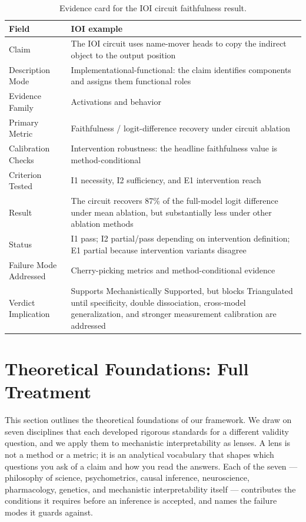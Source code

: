 \documentclass{article}
\begin{document}
\begin{table}[H]
\centering
\small
\caption{Evidence card for the IOI circuit faithfulness result.}
\renewcommand{\arraystretch}{1.2}
\begin{tabular}{@{}lp{10cm}@{}}
\toprule
\textbf{Field} & \textbf{IOI example} \\
\midrule
Claim & The IOI circuit uses name-mover heads to copy the indirect object to the output position \\
\midrule
Description Mode & Implementational-functional: the claim identifies components and assigns them functional roles \\
\midrule
Evidence Family & Activations and behavior \\
\midrule
Primary Metric & Faithfulness / logit-difference recovery under circuit ablation \\
\midrule
Calibration Checks & Intervention robustness: the headline faithfulness value is method-conditional \\
\midrule
Criterion Tested & I1 necessity, I2 sufficiency, and E1 intervention reach \\
\midrule
Result & The circuit recovers 87\% of the full-model logit difference under mean ablation, but substantially less under other ablation methods \\
\midrule
Status & I1 pass; I2 partial/pass depending on intervention definition; E1 partial because intervention variants disagree \\
\midrule
Failure Mode Addressed & Cherry-picking metrics and method-conditional evidence \\
\midrule
Verdict Implication & Supports Mechanistically Supported, but blocks Triangulated until specificity, double dissociation, cross-model generalization, and stronger measurement calibration are addressed \\
\bottomrule
\end{tabular}
\label{tabevidencecardioi}
\end{table}

\section{Theoretical Foundations: Full Treatment}
\label{app:foundations}

This section outlines the theoretical foundations of our framework. We draw on seven disciplines that each developed rigorous standards for a different validity question, and we apply them to mechanistic interpretability as lenses. A lens is not a method or a metric; it is an analytical vocabulary that shapes which questions you ask of a claim and how you read the answers. Each of the seven --- philosophy of science, psychometrics, causal inference, neuroscience, pharmacology, genetics, and mechanistic interpretability itself --- contributes the conditions it requires before an inference is accepted, and names the failure modes it guards against.
\end{document}
